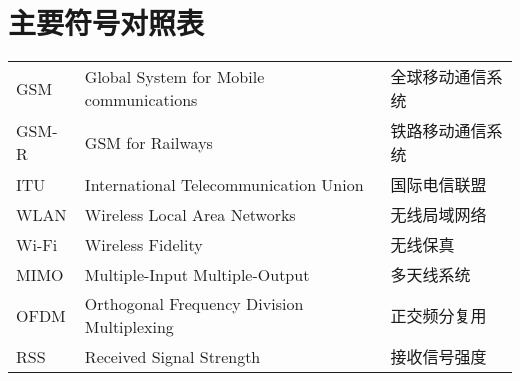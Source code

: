 
\chapter{主要符号对照表}
\label{chap:symb}

\noindent
\begin{supertabular}{lll}
GSM         & \hspace{0.5em}Global System for Mobile communications   & \hspace{0.5em}全球移动通信系统 \\
GSM-R       & \hspace{0.5em}GSM for Railways                          & \hspace{0.5em}铁路移动通信系统 \\
ITU         & \hspace{0.5em}International Telecommunication Union     & \hspace{0.5em}国际电信联盟 \\
WLAN        & \hspace{0.5em}Wireless Local Area Networks              & \hspace{0.5em}无线局域网络 \\
Wi-Fi       & \hspace{0.5em}Wireless Fidelity                         & \hspace{0.5em}无线保真 \\
MIMO        & \hspace{0.5em}Multiple-Input Multiple-Output            & \hspace{0.5em}多天线系统 \\
OFDM        & \hspace{0.5em}Orthogonal Frequency Division Multiplexing& \hspace{0.5em}正交频分复用 \\
RSS         & \hspace{0.5em}Received Signal Strength                  & \hspace{0.5em}接收信号强度 \\

\end{supertabular}
